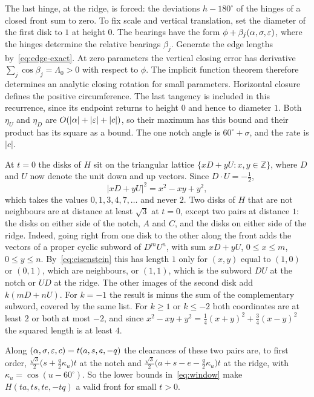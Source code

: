 The last hinge, at the ridge, is forced: the deviations $h-180^\circ$ of the hinges of a closed front sum
to zero. To fix scale and vertical translation, set the diameter of the first disk to $1$ at height $0$.
The bearings have the form $\phi+\beta_j(\alpha,\sigma,\varepsilon)$, where the hinges determine the relative
bearings $\beta_j$. Generate the edge lengths by~\eqref{eq:edge-exact}. At zero parameters the
vertical closing error has derivative $\sum_j\cos\beta_j=\Lambda_0>0$ with respect to $\phi$.
The implicit function theorem therefore determines an analytic closing rotation for small
parameters. Horizontal closure defines the positive circumference. The last tangency is included
in this recurrence, since its endpoint returns to height $0$ and hence to diameter $1$.
Both $\eta_U$ and $\eta_D$ are $O(|\alpha|+|\varepsilon|+|c|)$, so their maximum has this bound and
their product has its square as a bound. The one notch angle is
$60^\circ+\sigma$, and the rate is $|c|$.

At $t=0$ the disks of $H$ sit on the triangular lattice $\{xD+yU:x,y\in\mathbb Z\}$, where $D$ and $U$ now
denote the unit down and up vectors. Since $D\cdot U=-\tfrac12$,
\begin{equation}\label{eq:eisenstein}
|xD+yU|^2=x^2-xy+y^2,
\end{equation}
which takes the values $0,1,3,4,7,\dots$ and never $2$. Two disks of $H$ that are not neighbours are at
distance at least $\sqrt3$ at $t=0$, except two pairs at distance $1$: the disks on either side of the
notch, $A$ and $C$, and the disks on either side of the ridge. Indeed, going right from one disk to the
other along the front adds the vectors of a proper cyclic subword of $D^mU^n$, with sum $xD+yU$,
$0\le x\le m$, $0\le y\le n$. By~\eqref{eq:eisenstein} this has length $1$ only for $(x,y)$ equal to
$(1,0)$ or $(0,1)$, which are neighbours, or $(1,1)$, which is the subword $DU$ at the notch or $UD$ at
the ridge. The other images of the second disk add $k(mD+nU)$. For $k=-1$ the result is minus the sum
of the complementary subword, covered by the same list. For $k\ge1$ or $k\le-2$ both coordinates are
at least $2$ or both at most $-2$, and since $x^2-xy+y^2=\tfrac14(x+y)^2+\tfrac34(x-y)^2$ the squared
length is at least $4$.

\begin{lemma}[Validity]\label{lem:valid}
Along $(\alpha,\sigma,\varepsilon,c)=t(a,s,e,-q)$ the clearances of these two pairs are, to first order,
$\tfrac{\sqrt3}2\bigl(s+\tfrac q2\kappa_u\bigr)t$ at the notch and $\tfrac{\sqrt3}2\bigl(a+s-e-\tfrac q2\kappa_u\bigr)t$ at the
ridge, with $\kappa_u=\cos(u-60^\circ)$. So the lower bounds in~\eqref{eq:window} make $H(ta,ts,te,-tq)$ a
valid front for small $t>0$.
\end{lemma}

